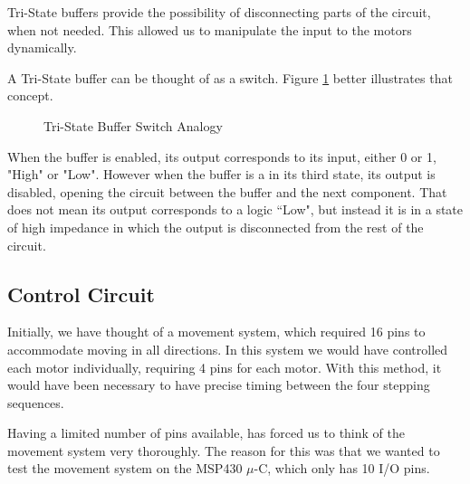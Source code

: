Tri-State buffers provide the possibility of disconnecting parts of the circuit, when not needed.
This allowed us to manipulate the input to the motors dynamically.

A Tri-State buffer can be thought of as a switch. Figure \ref{fig:tristate} better illustrates that 
concept.
\begin{figure}[htp]
	\begin{center}
	\hspace{2cm}
	\caption{Tri-State Buffer Switch Analogy}
	\label{fig:tristate}
	\end{center}
\end{figure}


When the buffer is enabled, its output corresponds to its input, either 0 or 1, "High" or "Low".
However when the buffer is a in its third state, its output is disabled, opening the circuit 
between the buffer and the next component.
That does not mean its output corresponds to a logic “Low", but instead it is in a state of high 
impedance in which the output is disconnected from the rest of the circuit.
\newpage
\subsection{Control Circuit}\label{sub:circuit}
Initially, we have thought of a movement system,
which required 16 pins to accommodate moving in all directions.
In this system we would have controlled each motor individually,
requiring 4 pins for each motor.
With this method,
it would have been necessary to have precise timing between the four stepping sequences.

Having a limited number of pins available, has forced us to think of the movement system very thoroughly.
The reason for this was that we wanted to test the movement system on the MSP430 $\mu$-C,
which only has 10 I/O pins. \cite{msp430}

